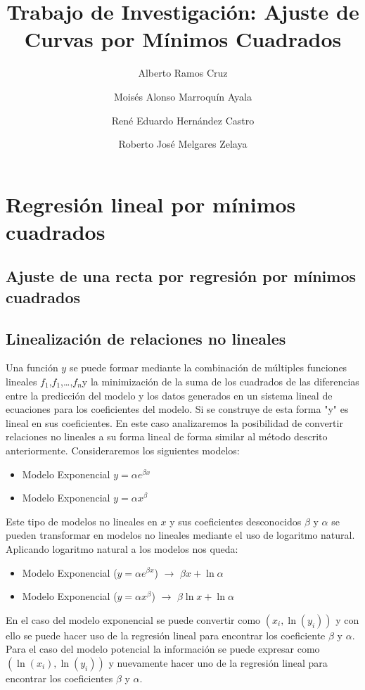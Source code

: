 \documentclass[11pt,letterpaper]{article}
\begin{document}
\title{Trabajo de Investigación: Ajuste de Curvas por Mínimos Cuadrados}

\author{
	Alberto Ramos Cruz
	\and Moisés Alonso Marroquín Ayala
	\and René Eduardo Hernández Castro
	\and Roberto José Melgares Zelaya
}
\maketitle


\section{Regresión lineal por mínimos cuadrados}
\subsection{Ajuste de una recta por regresión por mínimos cuadrados}

\subsection{Linealización de relaciones no lineales}
Una función $y$ se puede formar mediante la combinación de múltiples funciones lineales $f_1$,$f_1$,\dots,$f_n$y la minimización de la suma de los cuadrados de las diferencias entre la predicción del modelo y los datos generados en un sistema lineal de ecuaciones para los coeficientes del modelo. Si se construye de esta forma "y" es lineal en sus coeficientes. En este caso analizaremos la posibilidad de convertir relaciones no lineales a su forma lineal de forma similar al método descrito anteriormente.\cite{ualberta} Consideraremos los siguientes modelos:
\begin{itemize}
	\item Modelo Exponencial $y = \alpha e^{\beta x}$
	\item Modelo Exponencial $y = \alpha x^{\beta}$
\end{itemize}
\par Este tipo de modelos no lineales en $x$ y sus coeficientes desconocidos $\beta$ y $\alpha$ se pueden transformar en modelos no lineales mediante el uso de logaritmo natural. Aplicando logaritmo natural a los modelos nos queda:
\begin{itemize}
	\item Modelo Exponencial ($y = \alpha e^{\beta x}$) $\longrightarrow$ $\beta x + \ln \alpha$
	\item Modelo Exponencial ($y = \alpha x^{\beta}$) $\longrightarrow$ $\beta \ln x + \ln \alpha$
\end{itemize}
\par 
En el caso del modelo exponencial se puede convertir como $(x_i, \ln(y_i))$ y con ello se puede hacer uso de la regresión lineal  para encontrar los coeficiente $\beta$ y $\alpha$. Para el caso del modelo potencial la información se puede expresar como $(\ln(x_i), \ln(y_i))$ y nuevamente hacer uno de la regresión lineal para encontrar los coeficientes $\beta$ y $\alpha$.\cite{ualberta}\cite{nieves2011metodos} 
\end{document}
